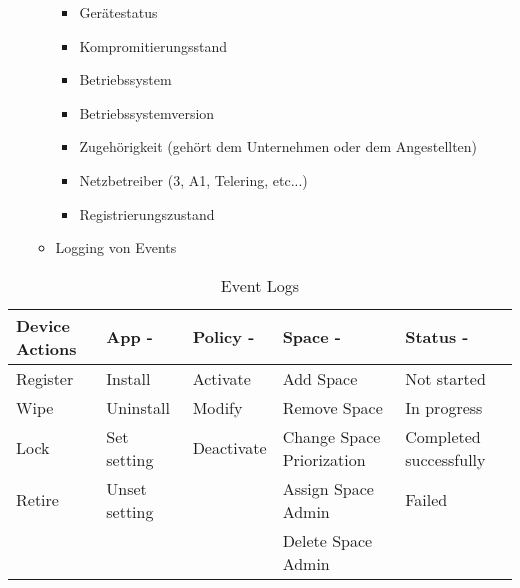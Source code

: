 \begin{itemize}
\begin{itemize}
		\begin{itemize}
			\item Gerätestatus
			\item Kompromitierungsstand
			\item Betriebssystem
			\item Betriebssystemversion
			\item Zugehörigkeit (gehört dem Unternehmen oder dem Angestellten)
			\item Netzbetreiber (3, A1, Telering, etc...)
			\item Registrierungszustand 
		\end{itemize}
		\item Logging von Events
	\end{itemize}
\end{itemize}	

\begin{table}[h]
\centering
\begin{tabular}{|l|l|l|l|l|}
\hline
\textbf{Device Actions} & \textbf{App -} & \textbf{Policy -} & \textbf{Space -}          & \textbf{Status -}      \\ \hline
Register                & Install        & Activate          & Add Space                 & Not started            \\ \hline
Wipe                    & Uninstall      & Modify            & Remove Space              & In progress            \\ \hline
Lock                    & Set setting    & Deactivate        & Change Space Priorization & Completed successfully \\ \hline
Retire                  & Unset setting  &                   & Assign Space Admin        & Failed                 \\ \hline
                        &                &                   & Delete Space Admin        &                        \\ \hline
\end{tabular}
\caption{Event Logs}
\end{table}
